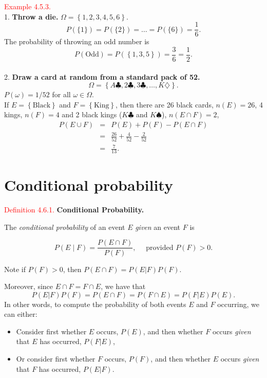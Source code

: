 \documentclass[
]{book}
\providecommand{\tightlist}{%
  \setlength{\itemsep}{0pt}\setlength{\parskip}{0pt}}
\begin{document}
\leavevmode{}%
\textcolor{red}{Example 4.5.3.}\\
1. {\textbf{Throw a die.}} \(\Omega = \left\{ 1,2,3,4,5,6 \right\}\).
\[ P(\{1\})=P(\{2\})= \ldots = P(\{6\})= \frac{1}{6}. \]
The probability of throwing an odd number is
\[P(\mbox{Odd}) = P( \left\{ 1,3,5 \right\}) = \frac{3}{6} = \frac{1}{2}. \]\\
2. {\textbf{Draw a card at random from a standard pack of 52.}}
\[\Omega = \left\{ A\clubsuit, 2\clubsuit, 3\clubsuit, \ldots, K\diamondsuit \right\}. \]
\(P(\omega) = 1/52\) for all \(\omega \in \Omega\).\\
If \(E = \left\{ \mbox{Black} \right\}\) and \(F = \left\{ \mbox{King} \right\}\),
then there are 26 black cards, \(n(E) =26\), 4 kings, \(n(F)=4\) and 2 black kings (\(K\clubsuit\) and \(K\spadesuit\)), \(n(E\cap F)=2\),
\begin{eqnarray*}
P(E \cup F) & = & P(E) + P(F) - P(E \cap F) \\
& = & \frac{26}{52} + \frac{4}{52} - \frac{2}{52} \\
& = & \frac{7}{13}.
\end{eqnarray*}

\hypertarget{prob:Conditional_Probability}{%
\section{Conditional probability}\label{prob:Conditional_Probability}}

\leavevmode{}%
\textcolor{red}{Definition 4.6.1.}
{\textbf{Conditional Probability.}}

The \emph{conditional probability} of an event \(E\) \emph{given} an event \(F\) is

\[P(E\mid F)=\frac{P(E\cap F)}{P(F)},\quad \mbox{ provided } P(F)>0.\]

Note if \(P(F)>0\), then \(P(E \cap F) = P(E|F) P(F)\).

Moreover, since \(E \cap F = F \cap E\), we have that
\[ P(E|F) P(F) = P(E \cap F) = P (F \cap E) = P(F|E) P(E).   \]
In other words, to compute the probability of both events \(E\) and \(F\) occurring, we can either:

\begin{itemize}
\tightlist
\item
  Consider first whether \(E\) occurs, \(P(E)\), and then whether \(F\) occurs \emph{given} that \(E\) has occurred, \(P(F|E)\),\\
\item
  Or consider first whether \(F\) occurs, \(P(F)\), and then whether \(E\) occurs \emph{given} that \(F\) has occurred, \(P(E|F)\).
\end{itemize}
\end{document}
